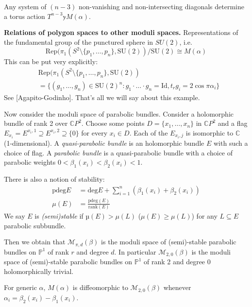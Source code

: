 \begin{remark}
\label{remark-nonvanishing-and-nonintersecting-diagonals}
Any system of $(n-3)$ non-vanishing
and non-intersecting diagonals determine
a torus action $T^{n-3}\mathbb{y} M(\alpha)$.
\end{remark}

\medskip\noindent
{\bf Relations of polygon spaces to other moduli spaces.}
Representations of the fundamental group
of the punctured sphere in $SU(2)$, i.e.
$$
\text{Rep}(\pi_1(S^2\setminus \{p_1,\ldots,p_n\},\text{SU}(2))/\text{SU}(2) 
\cong
M(\alpha)
$$ 
This can be put very explicitly:
\begin{align*}
&\text{Rep}(\pi_1(S^2\setminus \{p_1,\ldots,p_n\},\text{SU}(2))\\
&=\{(g_1,\ldots,g_n)\in \text{SU}(2)^n:g_1\cdot\ldots\cdot g_n=\text{Id},
t_rg_i=2\cos\pi \alpha_i\}
\end{align*}
See [Agapito-Godinho]. That's all we
will say about this example.

\medskip\noindent
Now consider the moduli space of parabolic bundles.
Consider a holomorphic bundle of rank 2 over $\mathbb{C}P^{2}$.
Choose some points $D=\{x_1,\ldots,x_n\}$ in $\mathbb{C}P^{2}$ 
and a flag
$E_{x_i}=E^{x_i,1}\supseteq E^{x_i,2}\supseteq \{0\}$ 
for every $x_i \in D$. Each of the
$E_{x_i,j}$ is isomorphic to $\mathbb{C}$
(1-dimensional).
A {\it quasi-parabolic bundle} 
is an holomorphic bundle $E$
with such a choice of flag.
A {\it parabolic bundle} is a quasi-parabolic
bundle with a choice of parabolic weights
$0< \beta_1(x_i)< \beta_2(x_i)<1$.

There is also a notion of stability:
\begin{align*}
\text{pdeg}E&=\text{deg}E+ \sum_{i=1}^n (\beta_1(x_i)+\beta_2(x_i))\\
\mu(E)&=\frac{\text{pdeg}(E)}{\text{rank}(E)}
\end{align*}
We say $E$ is {\it (semi)stable} if
$µ(E)> \mu(L)$ ($\mu(E) \geq \mu(L)$)
for any $L \subseteq E$ parabolic
subbundle.

Then we obtain that $\mathcal{M}_{\pi,d}(\beta)$
is the moduli space of (semi)-stable
parabolic bundles on $\mathbb{P}^1$ 
of rank $r$ and degree $d$.
In particular $\mathcal{M}_{2,0}(\beta)$
is the moduli space of (semi)-stable parabolic
bundles on $\mathbb{P}^1$ of rank 2 and degree 0
holomorphically trivial.

\begin{theorem}
\label{theorem-Jeffrey-Godinho}
For generic $ \alpha$,
$M(\alpha)$ is diffeomorphic to
$\mathcal{M}_{2,0}(\beta)$ 
whenever $\alpha_i=\beta_2(x_i)-\beta_1(x_i)$.
\end{theorem}

